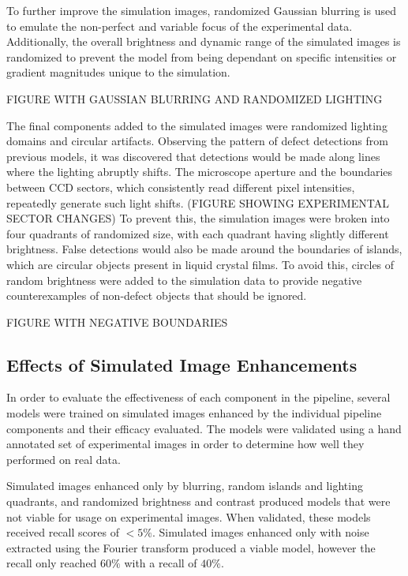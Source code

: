 \documentclass[prl,reprint,showpacs,floatfix,nofootinbib]{revtex4-1}
\begin{document}
To further improve the simulation images, randomized Gaussian blurring is used to emulate the non-perfect and variable focus of the experimental data. Additionally, the overall brightness and dynamic range of the simulated images is randomized to prevent the model from being dependant on specific intensities or gradient magnitudes unique to the simulation.

FIGURE WITH GAUSSIAN BLURRING AND RANDOMIZED LIGHTING

The final components added to the simulated images were randomized lighting domains and circular artifacts. Observing the pattern of defect detections from previous models, it was discovered that detections would be made along lines where the lighting abruptly shifts. The microscope aperture and the boundaries between CCD sectors, which consistently read different pixel intensities, repeatedly generate such light shifts. (FIGURE SHOWING EXPERIMENTAL SECTOR CHANGES) To prevent this, the simulation images were broken into four quadrants of randomized size, with each quadrant having slightly different brightness. False detections would also be made around the boundaries of islands, which are circular objects present in liquid crystal films. To avoid this, circles of random brightness were added to the simulation data to provide negative counterexamples of non-defect objects that should be ignored.

FIGURE WITH NEGATIVE BOUNDARIES


\subsection{Effects of Simulated Image Enhancements}

In order to evaluate the effectiveness of each component in the pipeline, several models were trained on simulated images enhanced by the individual pipeline components and their efficacy evaluated. The models were validated using a hand annotated set of experimental images in order to determine how well they performed on real data.

Simulated images enhanced only by blurring, random islands and lighting quadrants, and randomized brightness and contrast produced models that were not viable for usage on experimental images. When validated, these models received recall scores of $<5\%$. Simulated images enhanced only with noise extracted using the Fourier transform produced a viable model, however the recall only reached $60\%$ with a recall of $40\%$. 
\end{document}
